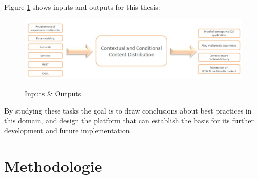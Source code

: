 \pagebreak

Figure \ref{fig:inout} shows inputs and outputs for this thesis:

\begin{figure}[htb]
  \centering
  \includegraphics[scale=0.4]{Inp_Out.jpg}\\
  \caption{Inputs \& Outputs}
  \label{fig:inout}
\end{figure}

By studying these tasks the goal is to draw conclusions about best practices in this domain, and design the platform that can establish the basis for its further development and future implementation.


\section{Methodologie\label{sec:intro_meth}}
